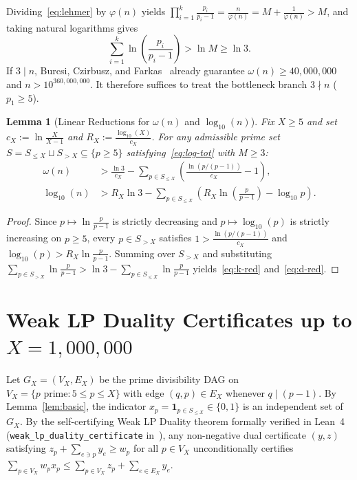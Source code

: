 \documentclass[11pt]{amsart}
\newtheorem{lemma}[theorem]{Lemma}
\theoremstyle{remark}
\numberwithin{equation}{section}
\begin{document}
Dividing~\eqref{eq:lehmer} by $\varphi(n)$ yields $\prod_{i=1}^k \frac{p_i}{p_i - 1} = \frac{n}{\varphi(n)} = M + \frac{1}{\varphi(n)} > M$, and taking natural logarithms gives
\begin{equation}\label{eq:log-tot}
    \sum_{i=1}^k \ln\!\left(\frac{p_i}{p_i - 1}\right) > \ln M \ge \ln 3.
\end{equation}
If $3 \mid n$, Burcsi, Czirbusz, and Farkas~\cite{BCF2011} already guarantee $\omega(n) \ge 40{,}000{,}000$ and $n > 10^{360{,}000{,}000}$. It therefore suffices to treat the bottleneck branch $3 \nmid n$ ($p_1 \ge 5$).

\begin{lemma}[Linear Reductions for $\omega(n)$ and $\log_{10}(n)$]\label{lem:red}
Fix $X \ge 5$ and set $c_X := \ln\frac{X}{X - 1}$ and $R_X := \frac{\log_{10}(X)}{c_X}$. For any admissible prime set $S = S_{\le X} \sqcup S_{> X} \subseteq \{p \ge 5\}$ satisfying~\eqref{eq:log-tot} with $M \ge 3$:
\begin{align}
    \omega(n) &> \frac{\ln 3}{c_X} - \sum_{p \in S_{\le X}} \left(\frac{\ln(p/(p-1))}{c_X} - 1\right), \label{eq:k-red} \\
    \log_{10}(n) &> R_X \ln 3 - \sum_{p \in S_{\le X}} \left(R_X \ln\!\left(\frac{p}{p-1}\right) - \log_{10} p\right). \label{eq:d-red}
\end{align}
\end{lemma}

\begin{proof}
Since $p \mapsto \ln\frac{p}{p-1}$ is strictly decreasing and $p \mapsto \log_{10}(p)$ is strictly increasing on $p \ge 5$, every $p \in S_{> X}$ satisfies $1 > \frac{\ln(p/(p-1))}{c_X}$ and $\log_{10}(p) > R_X \ln\frac{p}{p-1}$. Summing over $S_{> X}$ and substituting $\sum_{p \in S_{> X}} \ln\frac{p}{p-1} > \ln 3 - \sum_{p \in S_{\le X}} \ln\frac{p}{p-1}$ yields~\eqref{eq:k-red} and~\eqref{eq:d-red}.
\end{proof}

\section{Weak LP Duality Certificates up to $X = 1{,}000{,}000$}

Let $G_X = (V_X, E_X)$ be the prime divisibility DAG on $V_X = \{p \text{ prime} : 5 \le p \le X\}$ with edge $(q, p) \in E_X$ whenever $q \mid (p - 1)$. By Lemma~\ref{lem:basic}, the indicator $x_p = \mathbf{1}_{p \in S_{\le X}} \in \{0, 1\}$ is an independent set of $G_X$. By the self-certifying Weak LP Duality theorem formally verified in Lean~4 (\texttt{weak\_lp\_duality\_certificate} in~\cite{BarmaseNeon2026}), any non-negative dual certificate $(y, z)$ satisfying $z_p + \sum_{e \ni p} y_e \ge w_p$ for all $p \in V_X$ unconditionally certifies $\sum_{p \in V_X} w_p x_p \le \sum_{p \in V_X} z_p + \sum_{e \in E_X} y_e$.
\end{document}
